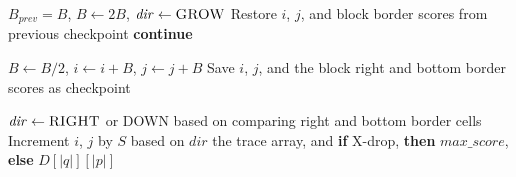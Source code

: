 \begin{algorithm}[H]
\begin{algorithmic}[1]
        \State $B_{prev}=B$, $B\gets2B$, $\mathit{dir}\gets\textsc{GROW}$
        \State Restore $i$, $j$, and block border scores from previous checkpoint
        \State \textbf{continue}
      \EndIf
      \State \strut
        \State $B\gets B/2$, $i\gets i+B$, $j\gets j+B$
        \State Save $i$, $j$, and the block right and bottom border scores as checkpoint
      \EndIf
      \State \strut
      \State $\mathit{dir}\gets\textsc{RIGHT}$ or \textsc{DOWN} based on comparing right and bottom border cells
      \State Increment $i$, $j$ by $S$ based on $\mathit{dir}$
    \EndWhile
    \State \Return the trace array, and \textbf{if} X-drop, \textbf{then} $\mathit{max\_score}$, \textbf{else} $D[|q|][|p|]$
  \EndProcedure
\end{algorithmic}
\end{algorithm}
